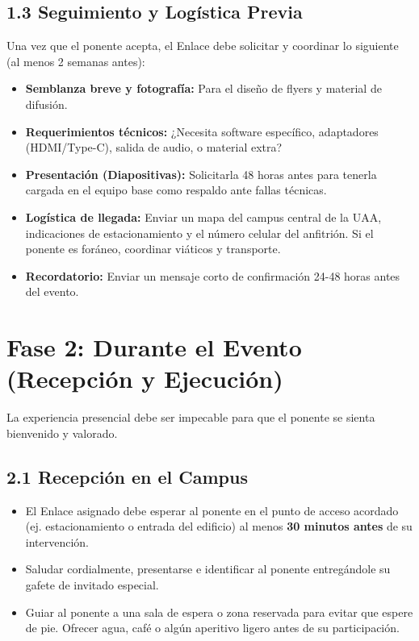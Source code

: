 \documentclass[11pt,a4paper]{article}
\begin{document}
\subsection{1.3 Seguimiento y Logística Previa}
Una vez que el ponente acepta, el Enlace debe solicitar y coordinar lo siguiente (al menos 2 semanas antes):
\begin{itemize}
    \item \textbf{Semblanza breve y fotografía:} Para el diseño de flyers y material de difusión.
    \item \textbf{Requerimientos técnicos:} ¿Necesita software específico, adaptadores (HDMI/Type-C), salida de audio, o material extra?
    \item \textbf{Presentación (Diapositivas):} Solicitarla 48 horas antes para tenerla cargada en el equipo base como respaldo ante fallas técnicas.
    \item \textbf{Logística de llegada:} Enviar un mapa del campus central de la UAA, indicaciones de estacionamiento y el número celular del anfitrión. Si el ponente es foráneo, coordinar viáticos y transporte.
    \item \textbf{Recordatorio:} Enviar un mensaje corto de confirmación 24-48 horas antes del evento.
\end{itemize}

\section{Fase 2: Durante el Evento (Recepción y Ejecución)}

La experiencia presencial debe ser impecable para que el ponente se sienta bienvenido y valorado.

\subsection{2.1 Recepción en el Campus}
\begin{itemize}
    \item El Enlace asignado debe esperar al ponente en el punto de acceso acordado (ej. estacionamiento o entrada del edificio) al menos \textbf{30 minutos antes} de su intervención.
    \item Saludar cordialmente, presentarse e identificar al ponente entregándole su gafete de invitado especial.
    \item Guiar al ponente a una sala de espera o zona reservada para evitar que espere de pie. Ofrecer agua, café o algún aperitivo ligero antes de su participación.
\end{itemize}
\end{document}
